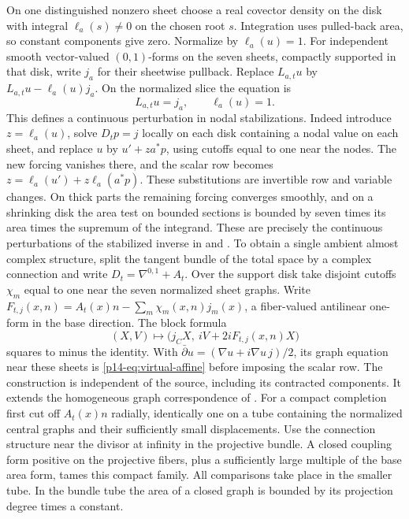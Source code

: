 On one distinguished nonzero sheet choose a real covector density on
the disk with integral $\ell_a(s)\ne0$ on the chosen root $s$.
Integration uses pulled-back area, so constant components give zero.
Normalize by $\ell_a(u)=1$. For independent smooth vector-valued
$(0,1)$-forms on the seven sheets, compactly supported in that disk,
write $j_a$ for their sheetwise pullback. Replace $L_{a,t}u$ by
$L_{a,t}u-\ell_a(u)j_a$. On the normalized slice the equation is
\begin{equation}\label{p14-eq:virtual-affine}
                      L_{a,t}u=j_a,\qquad \ell_a(u)=1 .
\end{equation}
This defines a continuous perturbation in nodal stabilizations.
Indeed introduce $z=\ell_a(u)$, solve $D_t p=j$ locally on each
disk containing a nodal value on each sheet, and replace $u$ by
$u'+za^*p$, using cutoffs equal to one near the nodes. The new forcing
vanishes there, and the scalar row becomes
$z=\ell_a(u')+z\ell_a(a^*p)$. These substitutions are invertible
row and variable changes. On thick parts the remaining forcing converges
smoothly, and on a shrinking disk the area test on bounded sections is
bounded by seven times its area times the supremum of the integrand.
These are precisely the continuous perturbations of the stabilized
inverse in \cite[Appendix~B]{bai} and
\cite[Propositions~B.7.9 and B.10.4]{pardonatlas}.
To obtain a single ambient almost complex structure, split the tangent
bundle of the total space by a complex connection and write
\(D_t=\nabla^{0,1}+A_t\). Over the support disk take disjoint cutoffs
\(\chi_m\) equal to one near the seven normalized sheet graphs.
Write \(F_{t,j}(x,n)=A_t(x)n-\sum_m\chi_m(x,n)j_m(x)\), a fiber-valued
antilinear one-form in the base direction. The block formula
\[
 (X,V)\longmapsto\big(j_CX,\ iV+2iF_{t,j}(x,n)X\big)
\]
squares to minus the identity. With
\(\bar\partial u=(\nabla u+i\nabla u\, j)/2\), its graph equation
near these sheets is \eqref{p14-eq:virtual-affine} before imposing the
scalar row. The construction is independent of the source, including
its contracted components. It extends the homogeneous graph
correspondence of \cite[Lemma~5.9]{bai}. For a compact completion first cut off \(A_t(x)n\) radially,
identically one on a tube containing the normalized central graphs
and their sufficiently small displacements. Use the connection
structure near the divisor at infinity in the projective bundle.
A closed coupling form positive on the projective fibers, plus a
sufficiently large multiple of the base area form, tames this compact
family. All comparisons take place in the smaller tube. In the
bundle tube the area of a closed graph is bounded by its projection
degree times a constant.

